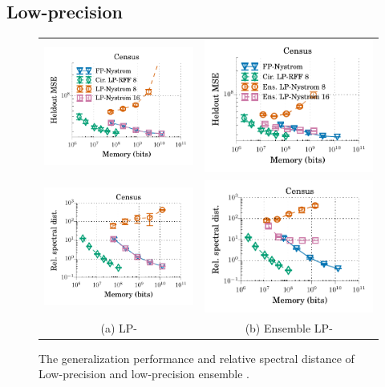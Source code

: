 \subsection{Low-precision \Nystrom}
\begin{figure}
\centering
\begin{tabular}{c c}
	\includegraphics[width=0.4\linewidth]{figures/lp_nystrom_mse_vs_mem.pdf} &
	\includegraphics[width=0.4\linewidth]{figures/lp_ensemble_nystrom_mse_vs_mem.pdf} \\
	\includegraphics[width=0.4\linewidth]{figures/lp_nystrom_delta_vs_mem.pdf} &
	\includegraphics[width=0.4\linewidth]{figures/lp_ensemble_nystrom_delta_vs_mem.pdf} \\
	(a) LP-\Nystrom & (b) Ensemble LP-\Nystrom
\end{tabular}
\caption{The generalization performance and relative spectral distance of Low-precision \Nystrom and low-precision ensemble \Nystrom.}	
\end{figure}


